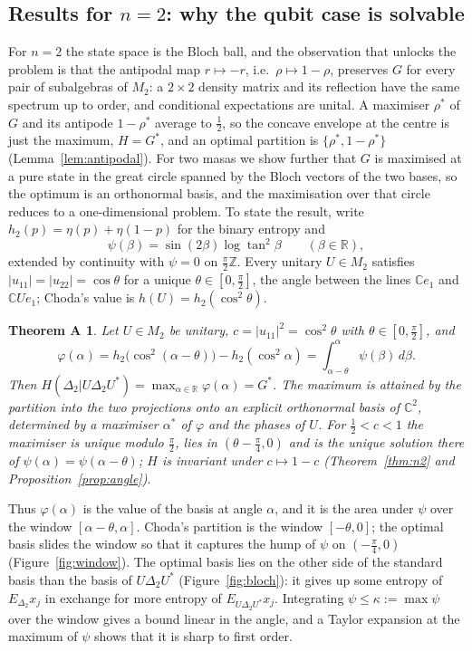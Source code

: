 \documentclass[11pt]{article}
\newcommand{\C}{\mathbb{C}}
\newcommand{\R}{\mathbb{R}}
\newcommand{\Z}{\mathbb{Z}}
\theoremstyle{plain}
\newtheorem*{thmA}{Theorem A}
\theoremstyle{definition}
\theoremstyle{remark}
\begin{document}
\subsection{Results for \texorpdfstring{$n=2$}{n=2}: why the qubit case is solvable}

For $n=2$ the state space is the Bloch ball, and the observation that unlocks the problem is that the antipodal map
$r\mapsto-r$, i.e.\ $\rho\mapsto1-\rho$, preserves $G$ for every pair of subalgebras of $M_2$: a $2\times2$ density matrix
and its reflection have the same spectrum up to order, and conditional expectations are unital. A maximiser $\rho^*$ of
$G$ and its antipode $1-\rho^*$ average to $\frac12$, so the concave envelope at the centre is just the maximum,
$H=G^*$, and an optimal partition is $\{\rho^*,1-\rho^*\}$ (Lemma~\ref{lem:antipodal}). For two masas we show further
that $G$ is maximised at a pure state in the great circle spanned by the Bloch vectors of the two bases, so the optimum is
an orthonormal basis, and the maximisation over that circle reduces to a one-dimensional problem. To state the result,
write $h_2(p)=\eta(p)+\eta(1-p)$ for the binary entropy and
\begin{equation}\label{eq:psi}
  \psi(\beta)=\sin(2\beta)\log\tan^2\beta\qquad(\beta\in\R),
\end{equation}
extended by continuity with $\psi=0$ on $\frac\pi2\Z$. Every unitary $U\in M_2$ satisfies $|u_{11}|=|u_{22}|=\cos\theta$ for
a unique $\theta\in[0,\frac\pi2]$, the angle between the lines $\C e_1$ and $\C Ue_1$; Choda's value is $h(U)=h_2(\cos^2\theta)$.

\begin{thmA}
Let $U\in M_2$ be unitary, $c=|u_{11}|^2=\cos^2\theta$ with $\theta\in[0,\frac\pi2]$, and
\[
  \varphi(\alpha)=h_2\bigl(\cos^2(\alpha-\theta)\bigr)-h_2(\cos^2\alpha)=\int_{\alpha-\theta}^{\alpha}\psi(\beta)\,d\beta .
\]
Then $H(\Delta_2|U\Delta_2U^*)=\max_{\alpha\in\R}\varphi(\alpha)=G^*$. The maximum is attained by the partition into the two
projections onto an explicit orthonormal basis of $\C^2$, determined by a maximiser $\alpha^*$ of $\varphi$ and the phases
of $U$. For $\frac12<c<1$ the maximiser is unique modulo $\frac\pi2$, lies in $(\theta-\frac\pi4,0)$ and is the unique
solution there of $\psi(\alpha)=\psi(\alpha-\theta)$; $H$ is invariant under $c\mapsto1-c$
(Theorem~\ref{thm:n2} and Proposition~\ref{prop:angle}).
\end{thmA}

Thus $\varphi(\alpha)$ is the value of the basis at angle $\alpha$, and it is the area under $\psi$ over the window
$[\alpha-\theta,\alpha]$. Choda's partition is the window $[-\theta,0]$; the optimal basis slides the window so that it
captures the hump of $\psi$ on $(-\frac\pi4,0)$ (Figure~\ref{fig:window}). The optimal basis lies on the other side of
the standard basis than the basis of $U\Delta_2U^*$ (Figure~\ref{fig:bloch}): it gives up some entropy of $E_{\Delta_2}x_j$
in exchange for more entropy of $E_{U\Delta_2U^*}x_j$. Integrating $\psi\le\kappa:=\max\psi$ over the window gives a bound
linear in the angle, and a Taylor expansion at the maximum of $\psi$ shows that it is sharp to first order.
\end{document}

